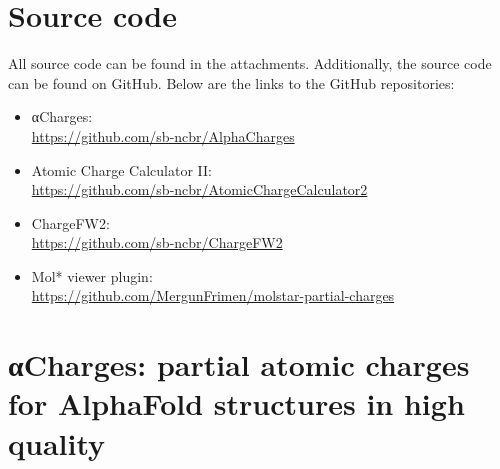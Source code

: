 \documentclass[
  digital,     %
  oneside,     %
  nosansbold,  %
  nocolorbold, %
  lof,         %
  lot,         %
]{fithesis4}
\begin{document}
\printbibliography[heading=bibintoc]

\renewcommand\appendixname{Appendix}
\newpage
{}

\begin{appendices}
  \chapter{Source code}
  \label{appendix:source-code}
  All source code can be found in the attachments. Additionally, the source code can be found on GitHub. Below are the links to the GitHub repositories:
  \begin{itemize}
    \item αCharges: \\
    \url{https://github.com/sb-ncbr/AlphaCharges}
    \item Atomic Charge Calculator II: \\
    \url{https://github.com/sb-ncbr/AtomicChargeCalculator2}
    \item ChargeFW2: \\
    \url{https://github.com/sb-ncbr/ChargeFW2}
    \item Mol* viewer plugin: \\
    \url{https://github.com/MergunFrimen/molstar-partial-charges}
  \end{itemize}

  \chapter[αCharges paper]{αCharges: partial atomic charges for AlphaFold
  structures in high quality}
  \label{appendix:alpha-charges}
  
\end{appendices}
\end{document}
